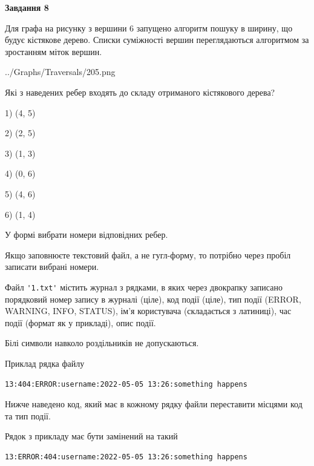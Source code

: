 \documentclass[12pt, ukrainian]{article}
\def\code#1{\Verb!#1!}
\begin{document}
{\begin {large}
{\begin {center}\textbf{Завдання 8}\end {center}}\par
Для графа на рисунку з вершини 6 запущено алгоритм пошуку в ширину, що будує кістякове дерево. Списки суміжності вершин переглядаються алгоритмом за зростанням міток вершин.\par
\begin{center}
	{../Graphs/Traversals/205.png}
\end{center}
\par Які з наведених ребер входять до складу отриманого кістякового дерева?\par
1) (4, 5)\par
2) (2, 5)\par
3) (1, 3)\par
4) (0, 6)\par
5) (4, 6)\par
6) (1, 4)\par
{\vskip 15pt} У формі вибрати номери відповідних ребер.


Якщо заповнюєте текстовий файл, а не гугл-форму, то потрібно через пробіл записа\-ти вибрані номери.\par
\newpage


Файл \code{'1.txt'} містить журнал з рядками, в яких через двокрапку записано поряд\-ко\-вий номер запису в журналі (ціле), код події (ціле), тип події (ERROR,\\ WARNING, INFO, STATUS), ім'я користувача (складається з латиниці), час події (фор\-мат як у прикладі), опис події.

Білі символи навколо роздільників не допускаються.

Приклад рядка файлу



\begin{verbatim}
13:404:ERROR:username:2022-05-05 13:26:something happens
\end{verbatim}


Нижче наведено код, який має в кожному рядку файли переставити місцями код та тип події.

Рядок з прикладу має бути замінений на такий



\begin{verbatim}
13:ERROR:404:username:2022-05-05 13:26:something happens
\end{verbatim}





\end{large}}
\end{document}
